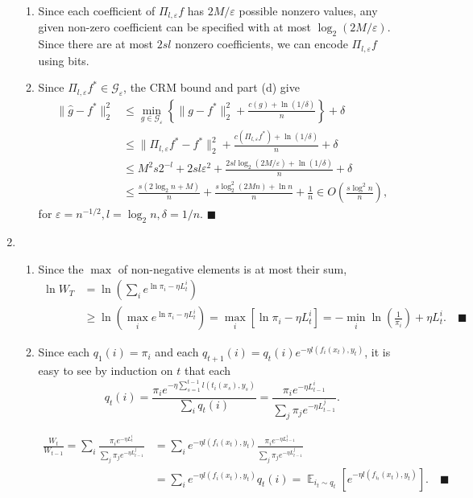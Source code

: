 \documentclass[11pt]{article}
\renewcommand{\qed}{\quad \ensuremath{\blacksquare}}
\newcommand{\E}{\mathop{\mathbb{E}}} %
\newcommand{\G}{\mathcal{G}}
\newcommand{\e}{\varepsilon} %
\renewcommand{\hat}{\widehat}
\begin{document}
\begin{enumerate}
\begin{enumerate}
\item Since each coefficient of $\Pi_{l,\e} f$ has $2M/\e$ possible nonzero
values, any given non-zero coefficient can be specified with at most
$\log_2 (2M/\e)$. Since there are at most $2sl$ nonzero coefficients, we can
encode $\Pi_{l,\e} f$ using \fbox{$C(\Pi_{l,\e} f) \leq 2sl \log_2(2M/\e)$}
bits.


\item Since $\Pi_{l,\e} f^* \in \G_\e$, the CRM bound and part (d) give
\begin{align*}
\|\hat g - f^*\|_2^2
 &  \leq \min_{g \in \G_\e} \left\{ \|g - f^*\|_2^2
                    + \frac{c(g) + \ln (1/\delta)}{n} \right\} + \delta     \\
 &  \leq \|\Pi_{l,\e} f^* - f^*\|_2^2
                    + \frac{c(\Pi_{l,\e} f^*) + \ln(1/\delta)}{n} + \delta  \\
 &  \leq M^2s2^{-l} + 2sl\e^2
                    + \frac{2sl \log_2(2M/\e) + \ln(1/\delta)}{n} + \delta  \\
 &  \leq \frac{s(2 \log_2 n + M)}{n}
                        + \frac{s \log_2^2(2Mn) + \ln n}{n} + \frac{1}{n}
    \in O\left( \frac{s \log^2 n}{n} \right),
\end{align*}
for $\e = n^{-1/2}, l = \log_2 n, \delta = 1/n$. \qed

\end{enumerate}

\newpage
\item
\begin{enumerate}
\item Since the $\max$ of non-negative elements is at most their sum,
\begin{align*}
\ln W_T
 &  = \ln \left( \sum_i e^{\ln \pi_i - \eta L_t^i} \right)  \\
 &  \geq \ln \left( \max_i e^{\ln \pi_i - \eta L_t^i} \right)
    = \max_i \left[ \ln \pi_i - \eta L_t^i \right]
    = -\min_i \ln\left( \frac{1}{\pi_i} \right) + \eta L_t^i. \qed
\end{align*}

\item Since each $q_1(i) = \pi_i$ and each
$q_{t + 1}(i) = q_t(i) e^{-\eta l(f_i(x_t), y_t)}$, it is easy to see by
induction on $t$ that each
\[q_t(i)
    = \frac{\pi_i e^{-\eta \sum_{s = 1}^{t - 1} l(t_i(x_s), y_s)}}
                                                                {\sum_i q_t(i)}
    = \frac{\pi_i e^{-\eta L_{t - 1}^i}}{\sum_j \pi_j e^{-\eta L_{t - 1}^j}}.\]

\begin{align*}
\frac{W_t}{W_{t - 1}}
    = \sum_i \frac{\pi_i e^{-\eta L_t^i}}{\sum_j \pi_j e^{-\eta L_{t - 1}^j}}
 &  = \sum_i e^{-\eta l(f_i(x_t), y_t)} \frac{\pi_i e^{-\eta L_{t - 1}^i}}
                                    {\sum_j \pi_j e^{-\eta L_{t - 1}^j}}    \\
 &  = \sum_i e^{-\eta l(f_i(x_t), y_t)} q_t(i)
    = \E_{i_t \sim q_t} \left[ e^{-\eta l(f_{i_t}(x_t), y_t)} \right]. \qed
\end{align*}


\end{enumerate}
\end{enumerate}
\end{document}
